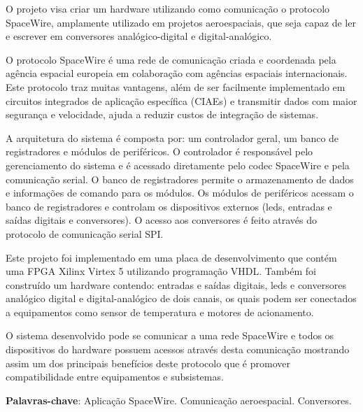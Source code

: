 \documentclass[
	12pt,				%
	openright,			%
	twoside,			%
	a4paper,			%
	english,			%
	french,				%
	spanish,			%
	brazil				%
	]{abntex2}
\begin{document}
\begin{resumo} 
	O projeto visa criar um hardware utilizando como comunicação o protocolo SpaceWire, amplamente utilizado em projetos aeroespaciais, que seja capaz de ler e escrever em conversores analógico-digital e digital-analógico.
	
	O protocolo SpaceWire é uma rede de comunicação criada e coordenada pela agência espacial europeia em colaboração com agências espaciais internacionais. Este protocolo traz muitas vantagens, além de ser facilmente implementado em circuitos integrados de aplicação específica (CIAEs) e transmitir dados com maior segurança e velocidade, ajuda a reduzir custos de integração de sistemas.
	
	A arquitetura do sistema é composta por: um controlador geral, um banco de registradores e módulos de periféricos. O controlador é responsável pelo gerenciamento do sistema e é acessado diretamente pelo codec SpaceWire e pela comunicação serial. O banco de registradores permite o armazenamento de dados e informações de comando para os módulos. Os módulos de periféricos acessam o banco de registradores e controlam os dispositivos externos (leds, entradas e saídas digitais e conversores). O acesso aos conversores é feito através do protocolo de comunicação serial SPI.
	
	Este projeto foi implementado em uma placa de desenvolvimento que contém uma FPGA Xilinx Virtex 5 utilizando programação VHDL. Também foi construído um hardware contendo: entradas e saídas digitais, leds e conversores analógico digital e digital-analógico de dois canais, os quais podem ser conectados a equipamentos como sensor de temperatura e motores de acionamento.
	
	O sistema desenvolvido pode se comunicar a uma rede SpaceWire e todos os dispositivos do hardware possuem acessos através desta comunicação mostrando assim um dos principais benefícios deste protocolo que é promover compatibilidade entre equipamentos e subsistemas.


 \textbf{Palavras-chave}: Aplicação SpaceWire. Comunicação aeroespacial. Conversores.
\end{resumo}
\end{document}
